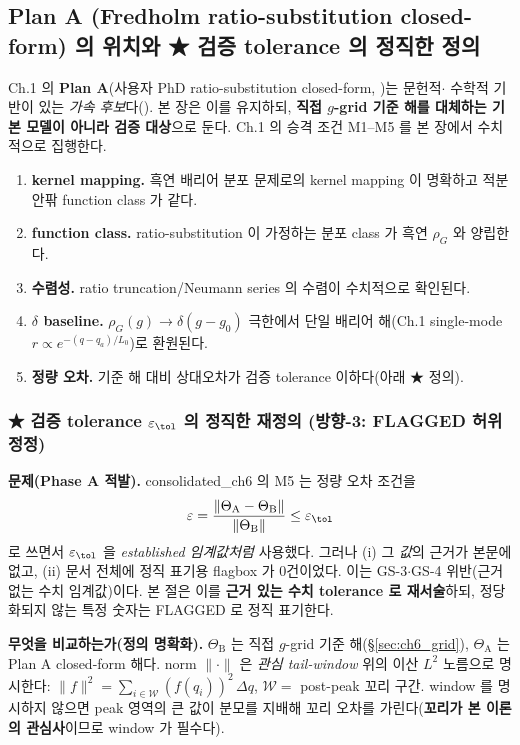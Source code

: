 \subsection{Plan A (Fredholm ratio-substitution closed-form) 의 위치와 ★ 검증 tolerance 의 정직한 정의}\label{sec:ch6_closure}
Ch.1 의 \textbf{Plan A}(사용자 PhD ratio-substitution closed-form, \cite{lee2011,son2013,jcp2017})는 문헌적$\cdot$
수학적 기반이 있는 \emph{가속 후보}다(). 본 장은 이를 유지하되, \textbf{직접 $g$-grid 기준 해를 대체하는
기본 모델이 아니라 검증 대상}으로 둔다. Ch.1 의 승격 조건 M1--M5 를 본 장에서 수치적으로 집행한다.
\begin{enumerate}[label=M\arabic*),leftmargin=2.4em]
\item \textbf{kernel mapping.} 흑연 배리어 분포 문제로의 kernel mapping 이 명확하고 적분 안팎 function class 가 같다.
\item \textbf{function class.} ratio-substitution 이 가정하는 분포 class 가 흑연 $\rho_G$ 와 양립한다.
\item \textbf{수렴성.} ratio truncation/Neumann series 의 수렴이 수치적으로 확인된다.
\item \textbf{$\delta$ baseline.} $\rho_G(g)\to\delta(g-g_0)$ 극한에서 단일 배리어 해(Ch.1 single-mode
  $r\propto e^{-(q-q_a)/L_0}$)로 환원된다.
\item \textbf{정량 오차.} 기준 해 대비 상대오차가 검증 tolerance 이하다(아래 ★ 정의).
\end{enumerate}

\subsubsection{★ 검증 tolerance $\varepsilon_\tol$ 의 정직한 재정의 (방향-3: FLAGGED 허위 정정)}\label{sec:ch6_epsilon}
\textbf{문제(Phase A 적발).} consolidated\_ch6 의 M5 는 정량 오차 조건을
\[
\varepsilon=\frac{\lVert\Theta_{\mathrm A}-\Theta_{\mathrm B}\rVert}{\lVert\Theta_{\mathrm B}\rVert}\le\varepsilon_\tol
\]
로 쓰면서 $\varepsilon_\tol$ 을 \emph{established 임계값처럼} 사용했다. 그러나 (i) 그 \emph{값}의 근거가 본문에
없고, (ii) 문서 전체에 정직 표기용 flagbox 가 0건이었다. 이는 GS-3$\cdot$GS-4 위반(근거 없는 수치 임계값)이다.
본 절은 이를 \textbf{근거 있는 수치 tolerance 로 재서술}하되, 정당화되지 않는 특정 숫자는 FLAGGED 로 정직 표기한다.

\textbf{무엇을 비교하는가(정의 명확화).} $\Theta_{\mathrm B}$ 는 직접 $g$-grid 기준 해(\S\ref{sec:ch6_grid}),
$\Theta_{\mathrm A}$ 는 Plan A closed-form 해다. norm $\lVert\cdot\rVert$ 은 \emph{관심 tail-window} 위의 이산
$L^2$ 노름으로 명시한다: $\lVert f\rVert^2=\sum_{i\in\mathcal W}(f(q_i))^2\,\Delta q$, $\mathcal W=$ post-peak 꼬리
구간. window 를 명시하지 않으면 peak 영역의 큰 값이 분모를 지배해 꼬리 오차를 가린다(\textbf{꼬리가 본 이론의
관심사}이므로 window 가 필수다).

